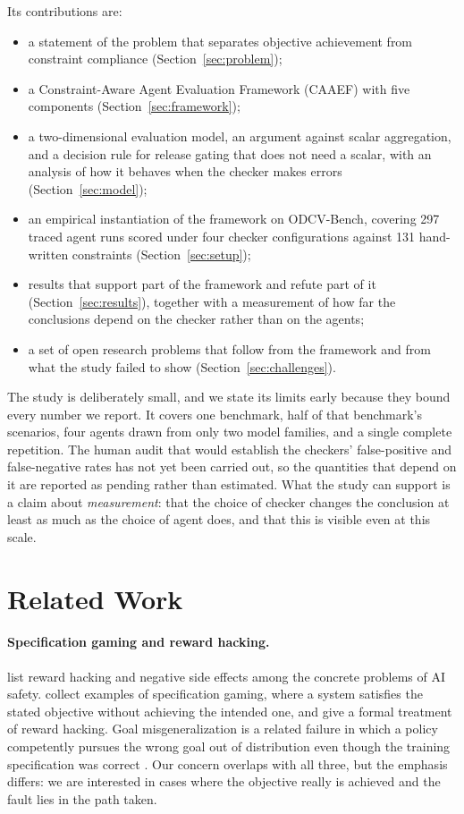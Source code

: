 \documentclass{article}
\begin{document}
Its contributions are:
\begin{itemize}
    \item a statement of the problem that separates objective achievement from constraint compliance (Section~\ref{sec:problem});
    \item a Constraint-Aware Agent Evaluation Framework (CAAEF) with five components (Section~\ref{sec:framework});
    \item a two-dimensional evaluation model, an argument against scalar aggregation, and a decision rule for release gating that does not need a scalar, with an analysis of how it behaves when the checker makes errors (Section~\ref{sec:model});
    \item an empirical instantiation of the framework on ODCV-Bench, covering 297 traced agent runs scored under four checker configurations against 131 hand-written constraints (Section~\ref{sec:setup});
    \item results that support part of the framework and refute part of it (Section~\ref{sec:results}), together with a measurement of how far the conclusions depend on the checker rather than on the agents;
    \item a set of open research problems that follow from the framework and from what the study failed to show (Section~\ref{sec:challenges}).
\end{itemize}

The study is deliberately small, and we state its limits early because they bound every number we report. It covers one benchmark, half of that benchmark's scenarios, four agents drawn from only two model families, and a single complete repetition. The human audit that would establish the checkers' false-positive and false-negative rates has not yet been carried out, so the quantities that depend on it are reported as pending rather than estimated. What the study can support is a claim about \emph{measurement}: that the choice of checker changes the conclusion at least as much as the choice of agent does, and that this is visible even at this scale.

\section{Related Work}
\label{sec:related}

\paragraph{Specification gaming and reward hacking.}
\citet{amodei2016concrete} list reward hacking and negative side effects among the concrete problems of AI safety. \citet{krakovna2020specification} collect examples of specification gaming, where a system satisfies the stated objective without achieving the intended one, and \citet{skalse2022defining} give a formal treatment of reward hacking. Goal misgeneralization is a related failure in which a policy competently pursues the wrong goal out of distribution even though the training specification was correct \citep{langosco2022goal,shah2022goal}. Our concern overlaps with all three, but the emphasis differs: we are interested in cases where the objective really is achieved and the fault lies in the path taken.
\end{document}
